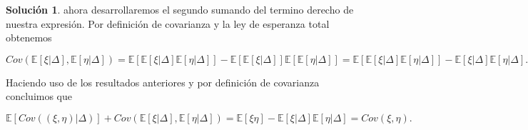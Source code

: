 \documentclass[letterpaper]{article}
\theoremstyle{definition}
\theoremstyle{lemathm}
\theoremstyle{lemathm}
\newtheorem{sol}{Solución}
\theoremstyle{lemathm}
\theoremstyle{lemademthm}
\newcommand{\pars}[1]{\left( #1 \right) }
\newcommand{\bracs}[1]{\left[ #1 \right] }
\newcommand{\EE}{\mathbb{E}}
\newcommand{\1}{\mathbbm{1}}
\begin{document}
\begin{enumerate}
\begin{enumerate}
\begin{sol}
				ahora desarrollaremos el segundo sumando del termino derecho de nuestra expresión. Por definición de covarianza y la ley de esperanza total obtenemos

				\[Cov\pars{\EE\bracs{\xi|\Delta},\EE\bracs{\eta|\Delta}} = \EE\bracs{\EE\bracs{\xi|\Delta}\EE\bracs{\eta|\Delta}} - \EE\bracs{\EE\bracs{\xi|\Delta}}\EE\bracs{\EE\bracs{\eta|\Delta}} = \EE\bracs{\EE\bracs{\xi|\Delta}\EE\bracs{\eta|\Delta}} - \EE\bracs{\xi|\Delta}\EE\bracs{\eta|\Delta}.\]

				Haciendo uso de los resultados anteriores y por definición de covarianza concluimos que

				\[\EE\bracs{Cov\pars{\pars{\xi,\eta}|\Delta}} + Cov\pars{\EE\bracs{\xi|\Delta},\EE\bracs{\eta|\Delta}} = \EE\bracs{\xi\eta} - \EE\bracs{\xi|\Delta}\EE\bracs{\eta|\Delta} = Cov\pars{\xi,\eta}.\]
			\end{sol}
		\end{enumerate}
	\end{enumerate}
\end{document}
